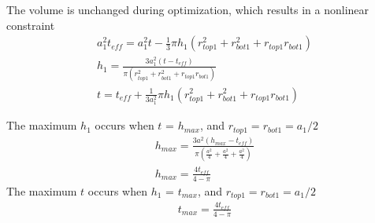 \documentclass[12pt]{article}
\numberwithin{equation}{section}
\numberwithin{equation}{section}
\begin{document}
The volume is unchanged during optimization, which results in a nonlinear constraint
\begin{align}
 a_{1}^2t_{eff} =a_{1}^2t - \frac{1}{3}\pi h_1(r_{top1}^2+r_{bot1}^2+r_{top1}r_{bot1})\nonumber \\
 h_1 = \frac{3a_{1}^2(t - t_{eff} )}{\pi(r_{top1}^2+r_{bot1}^2+r_{top1}r_{bot1})} \nonumber \\
 t = t_{eff} + \frac {1}{3a_1^2} \pi h_1(r_{top1}^2+r_{bot1}^2+r_{top1}r_{bot1})
 \end{align}
 
 

The maximum $h_1$ occurs when $t$ = $h_{max}$, and $r_{top1} = r_{bot1} = a_1/2$
\begin{align*}
h_{max} = \frac {3a^2(h_{max} - t_{eff})}{\pi (\frac {a^2}{4}+\frac {a^2}{4}+\frac {a^2}{4})} \\
h_{max} = \frac {4t_{eff}}{4-\pi}
\end{align*}
The maximum $t$ occurs when $h_1$ = $t_{max}$, and $r_{top1} = r_{bot1} = a_1/2$
\begin{align*}
t_{max} = \frac {4t_{eff}}{4-\pi} \\
\end{align*}
\end{document}
